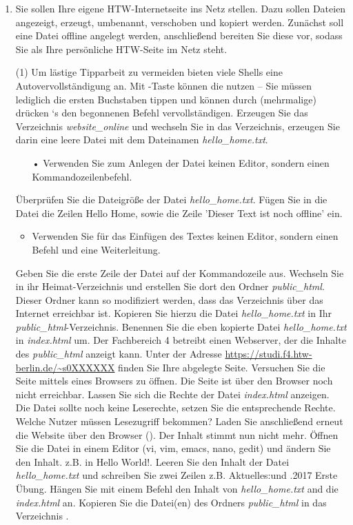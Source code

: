 \documentclass[paper=a4,fontsize=11pt]{scrartcl}%
\numberwithin{equation}{section}
\begin{document}
{\begin{enumerate}
  \item Sie sollen Ihre eigene HTW-Internetseite ins Netz stellen. Dazu sollen Dateien angezeigt, erzeugt, umbenannt, verschoben und kopiert werden. Zunächst soll eine Datei offline angelegt werden, anschließend bereiten Sie diese vor, sodass Sie als Ihre persönliche HTW-Seite im Netz steht.\\
        \begin{tasks}(1)
        \task Um lästige Tipparbeit zu vermeiden bieten viele Shells eine Autovervollständigung an. Mit \keys{\tab}-Taste können die nutzen -- Sie müssen lediglich die ersten Buchstaben tippen und können durch (mehrmalige) drücken \keys{\tab}`s den begonnenen Befehl vervollständigen.  
        \task Erzeugen Sie das Verzeichnis \textit{website\_online} und wechseln Sie in das Verzeichnis, erzeugen Sie darin eine leere Datei mit dem Dateinamen \textit{hello\_home.txt}.
	\begin{itemize}
		\item[•] \small Verwenden Sie zum Anlegen der Datei keinen Editor, sondern einen Kommandozeilenbefehl.
		\end{itemize}
		\task Überprüfen Sie die Dateigröße der Datei \textit{hello\_home.txt}. 
		\task Fügen Sie in die Datei die Zeilen \glqq Hello Home\grqq, sowie die Zeile 'Dieser Text ist noch offline' ein.
		\begin{itemize}
			\item \small Verwenden Sie für das Einfügen des Textes keinen Editor, sondern einen Befehl und eine Weiterleitung.
		\end{itemize}
		\task Geben Sie die erste Zeile der Datei auf der Kommandozeile aus.
		\task Wechseln Sie in ihr Heimat-Verzeichnis und erstellen Sie dort den Ordner \textit{public\_html}. Dieser Ordner kann so modifiziert werden, dass das Verzeichnis über das Internet erreichbar ist. Kopieren Sie hierzu die Datei \textit{hello\_home.txt} in Ihr \textit{public\_html}-Verzeichnis.
		\task Benennen Sie die eben kopierte Datei \textit{hello\_home.txt} in \textit{index.html} um.
		\task Der Fachbereich 4 betreibt einen Webserver, der die Inhalte des \textit{public\_html} anzeigt kann. Unter der Adresse \url{https://studi.f4.htw-berlin.de/~s0XXXXXX} finden Sie Ihre abgelegte Seite. Versuchen Sie die Seite mittels eines Browsers zu öffnen.
		\task Die Seite ist über den Browser noch nicht erreichbar. Lassen Sie sich die Rechte der Datei \textit{index.html} anzeigen. Die Datei sollte noch keine Leserechte, setzen Sie die entsprechende Rechte. Welche Nutzer müssen Lesezugriff bekommen? Laden Sie anschließend erneut die Website über den Browser ().
		\task Der Inhalt stimmt nun nicht mehr. Öffnen Sie die Datei in einem Editor (vi, vim, emacs, nano, gedit) und ändern Sie den Inhalt. z.B. in \glqq Hello World!\grqq.
		\task Leeren Sie den Inhalt der Datei \textit{hello\_home.txt} und schreiben Sie zwei Zeilen z.B. \glqq Aktuelles:\grqq und .2017 Erste Übung\grqq.
		\task Hängen Sie mit einem Befehl den Inhalt von \textit{hello\_home.txt} and die \textit{index.html} an.
          \task Kopieren Sie die Datei(en) des Ordners \textit{public\_html} in das Verzeichnis  .
        \end{tasks}
  


\end{enumerate}}
\end{document}
